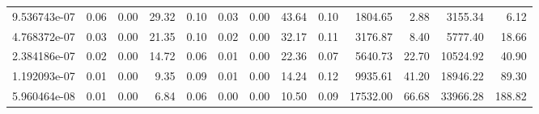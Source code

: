 \begin{tabular}{lrrrrrrrrrrrr}
9.536743e-07 &        0.06 &        0.00 &         29.32 &          0.10 &           0.03 &           0.00 &        43.64 &         0.10 &          1804.65 &             2.88 &         3155.34 &            6.12 \\
4.768372e-07 &        0.03 &        0.00 &         21.35 &          0.10 &           0.02 &           0.00 &        32.17 &         0.11 &          3176.87 &             8.40 &         5777.40 &           18.66 \\
2.384186e-07 &        0.02 &        0.00 &         14.72 &          0.06 &           0.01 &           0.00 &        22.36 &         0.07 &          5640.73 &            22.70 &        10524.92 &           40.90 \\
1.192093e-07 &        0.01 &        0.00 &          9.35 &          0.09 &           0.01 &           0.00 &        14.24 &         0.12 &          9935.61 &            41.20 &        18946.22 &           89.30 \\
5.960464e-08 &        0.01 &        0.00 &          6.84 &          0.06 &           0.00 &           0.00 &        10.50 &         0.09 &         17532.00 &            66.68 &        33966.28 &          188.82 \\
\bottomrule
\end{tabular}

